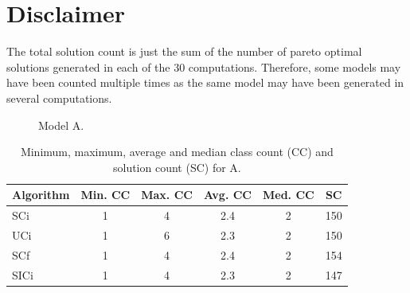 \documentclass[a4paper, 12pt]{scrartcl}
\begin{document}
\section*{Disclaimer}
The total solution count is just the sum of the number of pareto optimal solutions generated in each of the 30 computations. Therefore, some models may have been counted multiple times as the same model may have been generated in several computations.

\clearpage

\begin{figure}
\centering
{}%
\hfill
{}%
\caption{Model A.}
\end{figure}

\begin{table}%
\centering
\begin{tabular}{lccccc}
Algorithm & Min. CC & Max. CC & Avg. CC & Med. CC & SC\\
\hline
SCi & 1 & 4 & 2.4 & 2 & 150\\
UCi & 1 & 6 & 2.3 & 2 & 150\\
SCf & 1 & 4 & 2.4 & 2 & 154\\
SICi & 1 & 4 & 2.3 & 2 & 147
\end{tabular}
\caption{Minimum, maximum, average and median class count (CC) and solution count (SC) for A.}
\label{}
\end{table}
\end{document}

